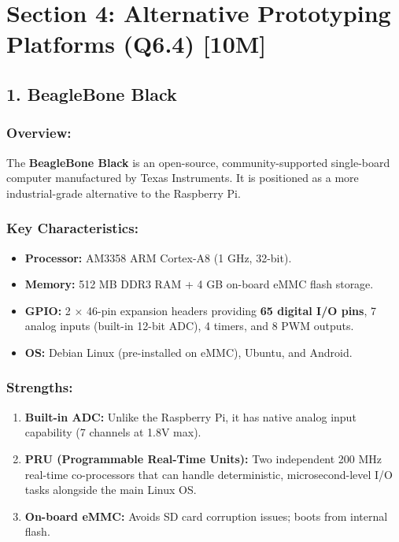 \section{Section 4: Alternative Prototyping Platforms (Q6.4) [10M]}

\subsection{1. BeagleBone Black}

\subsubsection{Overview:}
The \textbf{BeagleBone Black} is an open-source, community-supported single-board computer manufactured by Texas Instruments. It is positioned as a more industrial-grade alternative to the Raspberry Pi.

\subsubsection{Key Characteristics:}
\begin{itemize}
  \item   \textbf{Processor:} AM3358 ARM Cortex-A8 (1 GHz, 32-bit).
  \item   \textbf{Memory:} 512 MB DDR3 RAM + 4 GB on-board eMMC flash storage.
  \item   \textbf{GPIO:} 2 × 46-pin expansion headers providing \textbf{65 digital I/O pins}, 7 analog inputs (built-in 12-bit ADC), 4 timers, and 8 PWM outputs.
  \item   \textbf{OS:} Debian Linux (pre-installed on eMMC), Ubuntu, and Android.
\end{itemize}

\subsubsection{Strengths:}
\begin{enumerate}
  \item \textbf{Built-in ADC:} Unlike the Raspberry Pi, it has native analog input capability (7 channels at 1.8V max).
  \item \textbf{PRU (Programmable Real-Time Units):} Two independent 200 MHz real-time co-processors that can handle deterministic, microsecond-level I/O tasks alongside the main Linux OS.
  \item \textbf{On-board eMMC:} Avoids SD card corruption issues; boots from internal flash.
\end{enumerate}

